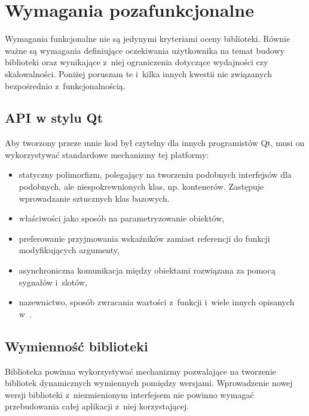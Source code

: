 \section{Wymagania pozafunkcjonalne}
Wymagania funkcjonalne nie są jedynymi kryteriami oceny biblioteki. Równie ważne są wymagania definiujące oczekiwania użytkownika na temat budowy biblioteki oraz wynikające z~niej ograniczenia dotyczące wydajności czy skalowalności. Poniżej poruszam te i~kilka innych kwestii nie związanych bezpośrednio z~funkcjonalnością.

\subsection{API w stylu Qt}


Aby tworzony przeze mnie kod był czytelny dla innych programistów Qt, musi on wykorzystywać standardowe mechanizmy tej platformy:
\begin{itemize}
\item{statyczny polimorfizm, polegający na tworzeniu podobnych interfejsów dla podobnych, ale niespokrewnionych klas, np. kontenerów. Zastępuje wprowadzanie sztucznych klas bazowych.}
\item{właściwości jako sposób na parametryzowanie obiektów,}
\item{preferowanie przyjmowania wskaźników zamiast referencji do funkcji modyfikujących argumenty,}
\item{asynchroniczna komunikacja między obiektami rozwiązana za pomocą sygnałów i~slotów,}
\item{nazewnictwo, sposób zwracania wartości z~funkcji i~wiele innych opisanych w~\cite{APIDesign}.}
\end{itemize}

\subsection{Wymienność biblioteki}
Biblioteka powinna wykorzystywać mechanizmy pozwalające na tworzenie bibliotek dynamicznych wymiennych pomiędzy wersjami. Wprowadzenie nowej wersji biblioteki z~niezmienionym interfejsem nie powinno wymagać przebudowania całej aplikacji z~niej korzystającej.

